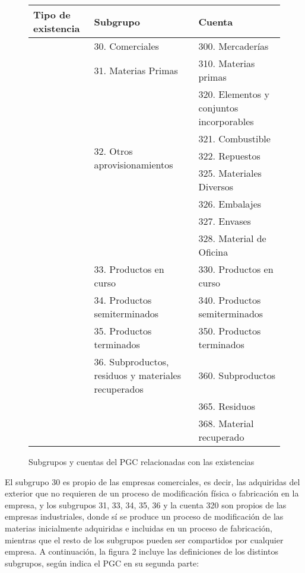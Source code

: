 \documentclass{article}
\begin{document}
\begin{figure}[H]
    \centering
    \begin{tabular}{|p{4cm}|p{4cm}|p{4cm}|}
        \hline
        \textbf{Tipo de existencia} & \textbf{Subgrupo} & \textbf{Cuenta} \\
        \hline
        \multirow{3}{*}{\rotatebox{90}{\parbox{2cm}{Adquiridas del exterior}}} & 30. Comerciales & 300. Mercaderías \\
        \cline{2-3}
        & 31. Materias Primas & 310. Materias primas \\
        \cline{2-3}
        & \multirow{6}{*}{\parbox{2cm}{32. Otros aprovisionamientos}} & 320. Elementos y conjuntos incorporables \\
        \cline{3-3}
        & & 321. Combustible \\
        \cline{3-3}
        & & 322. Repuestos \\
        \cline{3-3}
        & & 325. Materiales Diversos \\
        \cline{3-3}
        & & 326. Embalajes \\
        \cline{3-3}
        & & 327. Envases \\
        \cline{3-3}
        & & 328. Material de Oficina \\
        \hline
        \multirow{5}{*}{\rotatebox{90}{\parbox{2cm}{Surgidas del proceso productivo}}} & 33. Productos en curso & 330. Productos en curso \\
        \cline{2-3}
        & 34. Productos semiterminados & 340. Productos semiterminados \\
        \cline{2-3}
        & 35. Productos terminados & 350. Productos terminados \\
        \cline{2-3}
        & 36. Subproductos, residuos y materiales recuperados & 360. Subproductos \\    \cline{3-3}
        & & 365. Residuos \\
        \cline{3-3}
        & & 368. Material recuperado \\
        \hline
    \end{tabular}
    \caption{Subgrupos y cuentas del PGC relacionadas con las existencias}
\end{figure}

El subgrupo 30 es propio de las empresas comerciales, es decir, las adquiridas del exterior que no requieren de un proceso de modificación física o fabricación en la empresa, y los subgrupos 31, 33, 34, 35, 36 y la cuenta 320 son propios de las empresas industriales, donde sí se produce un proceso de modificación de las materias inicialmente adquiridas e incluidas en un proceso de fabricación, mientras que el resto de los subgrupos pueden ser compartidos por cualquier empresa. A continuación, la figura 2 incluye las definiciones de los distintos subgrupos, según indica el PGC en su segunda parte:
\end{document}
